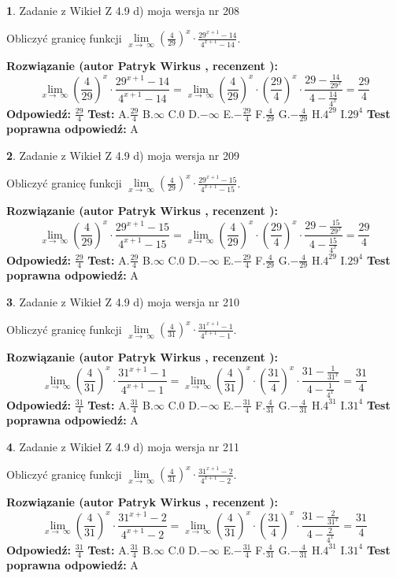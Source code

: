 \documentclass[12pt, a4paper]{article}
\theoremstyle{definition} %
\newtheorem{zad}{}
\newcommand{\zadStart}[1]{\begin{zad}#1\newline}
\newcommand{\zadStop}{\end{zad}}
\newcommand{\rozwStart}[2]{\noindent \textbf{Rozwiązanie (autor #1 , recenzent #2): }\newline}
\newcommand{\rozwStop}{\newline}
\newcommand{\odpStart}{\noindent \textbf{Odpowiedź:}\newline}
\newcommand{\odpStop}{\newline}
\newcommand{\testStart}{\noindent \textbf{Test:}\newline}
\newcommand{\testStop}{\newline}
\newcommand{\kluczStart}{\noindent \textbf{Test poprawna odpowiedź:}\newline}
\newcommand{\kluczStop}{\newline}
\begin{document}
\zadStart{Zadanie z Wikieł Z 4.9 d) moja wersja nr 208}


Obliczyć granicę funkcji  $\lim\limits_{x\to\ \infty}(\frac{4}{29})^{x}\cdot\frac{29^{x+1}-14}{4^{x+1}-14}$.
\zadStop
\rozwStart{Patryk Wirkus}{}
$$\lim\limits_{x\to\ \infty}(\frac{4}{29})^{x}\cdot\frac{29^{x+1}-14}{4^{x+1}-14}=\lim\limits_{x\to\ \infty}(\frac{4}{29})^{x}\cdot(\frac{29}{4})^{x} \cdot \frac{29-\frac{14}{29^{x}}}{4-\frac{14}{4^{x}}} = \frac{29}{4}$$
\rozwStop
\odpStart
$\frac{29}{4}$
\odpStop
\testStart
A.$\frac{29}{4}$ B.$\infty$ C.$0$ D.$-\infty$ E.$-\frac{29}{4}$
F.$\frac{4}{29}$ G.$-\frac{4}{29}$
H.$4^{29}$
I.$29^{4}$
\testStop
\kluczStart
A
\kluczStop



\zadStart{Zadanie z Wikieł Z 4.9 d) moja wersja nr 209}


Obliczyć granicę funkcji  $\lim\limits_{x\to\ \infty}(\frac{4}{29})^{x}\cdot\frac{29^{x+1}-15}{4^{x+1}-15}$.
\zadStop
\rozwStart{Patryk Wirkus}{}
$$\lim\limits_{x\to\ \infty}(\frac{4}{29})^{x}\cdot\frac{29^{x+1}-15}{4^{x+1}-15}=\lim\limits_{x\to\ \infty}(\frac{4}{29})^{x}\cdot(\frac{29}{4})^{x} \cdot \frac{29-\frac{15}{29^{x}}}{4-\frac{15}{4^{x}}} = \frac{29}{4}$$
\rozwStop
\odpStart
$\frac{29}{4}$
\odpStop
\testStart
A.$\frac{29}{4}$ B.$\infty$ C.$0$ D.$-\infty$ E.$-\frac{29}{4}$
F.$\frac{4}{29}$ G.$-\frac{4}{29}$
H.$4^{29}$
I.$29^{4}$
\testStop
\kluczStart
A
\kluczStop



\zadStart{Zadanie z Wikieł Z 4.9 d) moja wersja nr 210}


Obliczyć granicę funkcji  $\lim\limits_{x\to\ \infty}(\frac{4}{31})^{x}\cdot\frac{31^{x+1}-1}{4^{x+1}-1}$.
\zadStop
\rozwStart{Patryk Wirkus}{}
$$\lim\limits_{x\to\ \infty}(\frac{4}{31})^{x}\cdot\frac{31^{x+1}-1}{4^{x+1}-1}=\lim\limits_{x\to\ \infty}(\frac{4}{31})^{x}\cdot(\frac{31}{4})^{x} \cdot \frac{31-\frac{1}{31^{x}}}{4-\frac{1}{4^{x}}} = \frac{31}{4}$$
\rozwStop
\odpStart
$\frac{31}{4}$
\odpStop
\testStart
A.$\frac{31}{4}$ B.$\infty$ C.$0$ D.$-\infty$ E.$-\frac{31}{4}$
F.$\frac{4}{31}$ G.$-\frac{4}{31}$
H.$4^{31}$
I.$31^{4}$
\testStop
\kluczStart
A
\kluczStop



\zadStart{Zadanie z Wikieł Z 4.9 d) moja wersja nr 211}


Obliczyć granicę funkcji  $\lim\limits_{x\to\ \infty}(\frac{4}{31})^{x}\cdot\frac{31^{x+1}-2}{4^{x+1}-2}$.
\zadStop
\rozwStart{Patryk Wirkus}{}
$$\lim\limits_{x\to\ \infty}(\frac{4}{31})^{x}\cdot\frac{31^{x+1}-2}{4^{x+1}-2}=\lim\limits_{x\to\ \infty}(\frac{4}{31})^{x}\cdot(\frac{31}{4})^{x} \cdot \frac{31-\frac{2}{31^{x}}}{4-\frac{2}{4^{x}}} = \frac{31}{4}$$
\rozwStop
\odpStart
$\frac{31}{4}$
\odpStop
\testStart
A.$\frac{31}{4}$ B.$\infty$ C.$0$ D.$-\infty$ E.$-\frac{31}{4}$
F.$\frac{4}{31}$ G.$-\frac{4}{31}$
H.$4^{31}$
I.$31^{4}$
\testStop
\kluczStart
A
\kluczStop
\end{document}
